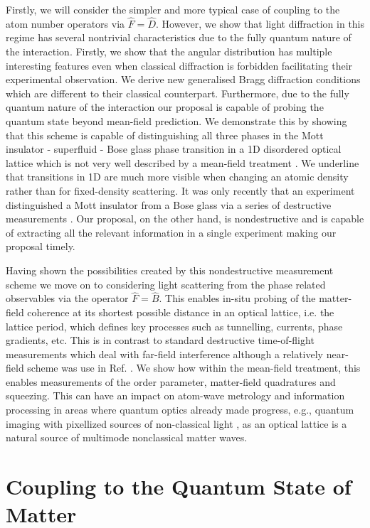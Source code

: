 Firstly, we will consider the simpler and more typical case of
coupling to the atom number operators via $\hat{F} =
\hat{D}$. However, we show that light diffraction in this regime has
several nontrivial characteristics due to the fully quantum nature of
the interaction. Firstly, we show that the angular distribution has
multiple interesting features even when classical diffraction is
forbidden facilitating their experimental observation. We derive new
generalised Bragg diffraction conditions which are different to their
classical counterpart. Furthermore, due to the fully quantum nature of
the interaction our proposal is capable of probing the quantum state
beyond mean-field prediction. We demonstrate this by showing that this
scheme is capable of distinguishing all three phases in the Mott
insulator - superfluid - Bose glass phase transition in a 1D
disordered optical lattice which is not very well described by a
mean-field treatment \cite{cazalilla2011, ejima2011, kuhner2000,
  pino2012, pino2013}. We underline that transitions in 1D are much
more visible when changing an atomic density rather than for
fixed-density scattering. It was only recently that an experiment
distinguished a Mott insulator from a Bose glass via a series of
destructive measurements \cite{derrico2014}. Our proposal, on the
other hand, is nondestructive and is capable of extracting all the
relevant information in a single experiment making our proposal
timely.

Having shown the possibilities created by this nondestructive
measurement scheme we move on to considering light scattering from the
phase related observables via the operator $\hat{F} = \hat{B}$. This
enables in-situ probing of the matter-field coherence at its shortest
possible distance in an optical lattice, i.e. the lattice period,
which defines key processes such as tunnelling, currents, phase
gradients, etc. This is in contrast to standard destructive
time-of-flight measurements which deal with far-field interference
although a relatively near-field scheme was use in
Ref. \cite{miyake2011}. We show how within the mean-field treatment,
this enables measurements of the order parameter, matter-field
quadratures and squeezing. This can have an impact on atom-wave
metrology and information processing in areas where quantum optics
already made progress, e.g., quantum imaging with pixellized sources
of non-classical light \cite{golubev2010, kolobov1999}, as an optical
lattice is a natural source of multimode nonclassical matter waves.

\section{Coupling to the Quantum State of Matter}

